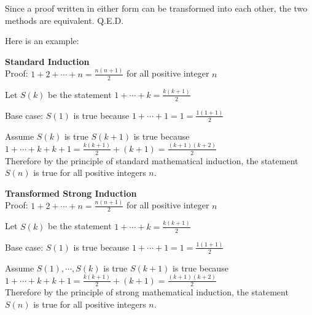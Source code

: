\begin{flushleft}
Since a proof written in either form can be transformed into each other, 
the two methods are equivalent. Q.E.D.
\vspace{10px}

Here is an example:
\vspace{10px}

\textbf{Standard Induction} \\
Proof: $1 + 2 + \cdots + n = \frac{n(n + 1)}{2}$ for all positive integer $n$
\vspace{10px}

Let $S(k)$ be the statement $1 + \cdots + k = \frac{k(k + 1)}{2}$
\vspace{10px}

Base case: 
$S(1)$ is true because $1 + \cdots + 1 = 1 = \frac{1(1 + 1)}{2}$
\vspace{10px}

Assume $S(k)$ is true
$S(k + 1)$ is true because $1 + \cdots + k + k + 1 
                         = \frac{k(k + 1)}{2} + (k + 1) 
                         = \frac{(k+1)(k + 2)}{2}$ \\
Therefore by the principle of standard mathematical induction, 
the statement $S(n)$ is true for all positive integers $n$.
\vspace{10px}

\textbf{Transformed Strong Induction} \\
Proof: $1 + 2 + \cdots + n = \frac{n(n + 1)}{2}$ for all positive integer $n$
\vspace{10px}

Let $S(k)$ be the statement $1 + \cdots + k = \frac{k(k + 1)}{2}$
\vspace{10px}

Base case: 
$S(1)$ is true because $1 + \cdots + 1 = 1 = \frac{1(1 + 1)}{2}$
\vspace{10px}

Assume $S(1), \cdots, S(k)$ is true
$S(k + 1)$ is true because $1 + \cdots + k + k + 1 
                         = \frac{k(k + 1)}{2} + (k + 1) 
                         = \frac{(k + 1)(k + 2)}{2}$ \\
Therefore by the principle of strong mathematical induction, 
the statement $S(n)$ is true for all positive integers $n$.
\end{flushleft}